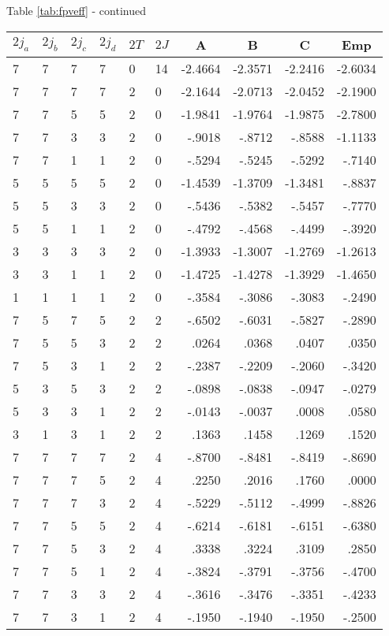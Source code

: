 \begin{center}{Table \ref{tab:fpveff} - continued}\end{center}
\clearpage
\small
\begin{center}
\begin{tabular}{llllllrrrr}
\hline
$2j_{a}$&$2j_{b}$&$2j_{c}$&$2j_{d}$&$2T$&$2J$&
\multicolumn{1}{c}{A}&
\multicolumn{1}{c}{B}&
\multicolumn{1}{c}{C}&
\multicolumn{1}{c}{Emp}
\\\hline
  7& 7& 7& 7& 0&14& -2.4664& -2.3571& -2.2416& -2.6034\\
  7& 7& 7& 7& 2& 0& -2.1644& -2.0713& -2.0452& -2.1900\\
  7& 7& 5& 5& 2& 0& -1.9841& -1.9764& -1.9875& -2.7800\\
  7& 7& 3& 3& 2& 0&  -.9018&  -.8712&  -.8588& -1.1133\\
  7& 7& 1& 1& 2& 0&  -.5294&  -.5245&  -.5292&  -.7140\\
  5& 5& 5& 5& 2& 0& -1.4539& -1.3709& -1.3481&  -.8837\\
  5& 5& 3& 3& 2& 0&  -.5436&  -.5382&  -.5457&  -.7770\\
  5& 5& 1& 1& 2& 0&  -.4792&  -.4568&  -.4499&  -.3920\\
  3& 3& 3& 3& 2& 0& -1.3933& -1.3007& -1.2769& -1.2613\\
  3& 3& 1& 1& 2& 0& -1.4725& -1.4278& -1.3929& -1.4650\\
  1& 1& 1& 1& 2& 0&  -.3584&  -.3086&  -.3083&  -.2490\\
  7& 5& 7& 5& 2& 2&  -.6502&  -.6031&  -.5827&  -.2890\\
  7& 5& 5& 3& 2& 2&   .0264&   .0368&   .0407&   .0350\\
  7& 5& 3& 1& 2& 2&  -.2387&  -.2209&  -.2060&  -.3420\\
  5& 3& 5& 3& 2& 2&  -.0898&  -.0838&  -.0947&  -.0279\\
  5& 3& 3& 1& 2& 2&  -.0143&  -.0037&   .0008&   .0580\\
  3& 1& 3& 1& 2& 2&   .1363&   .1458&   .1269&   .1520\\
  7& 7& 7& 7& 2& 4&  -.8700&  -.8481&  -.8419&  -.8690\\
  7& 7& 7& 5& 2& 4&   .2250&   .2016&   .1760&   .0000\\
  7& 7& 7& 3& 2& 4&  -.5229&  -.5112&  -.4999&  -.8826\\
  7& 7& 5& 5& 2& 4&  -.6214&  -.6181&  -.6151&  -.6380\\
  7& 7& 5& 3& 2& 4&   .3338&   .3224&   .3109&   .2850\\
  7& 7& 5& 1& 2& 4&  -.3824&  -.3791&  -.3756&  -.4700\\
  7& 7& 3& 3& 2& 4&  -.3616&  -.3476&  -.3351&  -.4233\\
  7& 7& 3& 1& 2& 4&  -.1950&  -.1940&  -.1950&  -.2500\\
\hline
\end{tabular}
\end{center}

